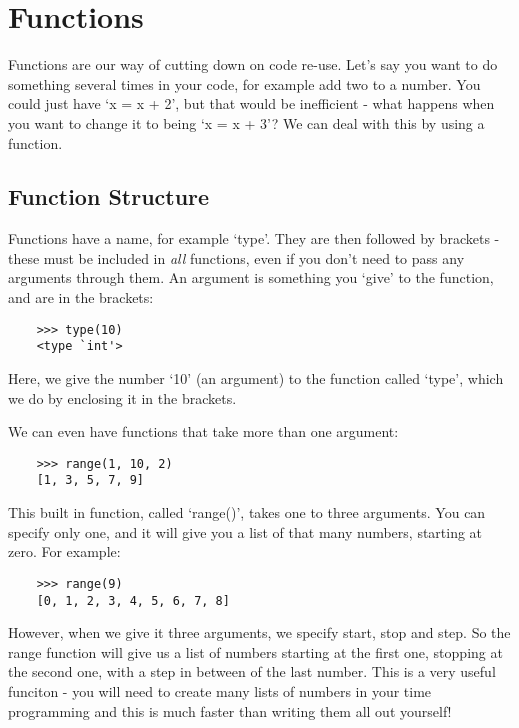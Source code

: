 \section{Functions}

Functions are our way of cutting down on code re-use. Let's say you want to do
something several times in your code, for example add two to a number. You could
just have `x = x + 2', but that would be inefficient - what happens when you
want to change it to being `x = x + 3'? We can deal with this by using a
function.

\subsection{Function Structure}

Functions have a name, for example `type'. They are then followed by brackets -
these must be included in \emph{all} functions, even if you don't need to pass
any arguments through them. An argument is something you `give' to the function,
and are in the brackets:

\begin{lstlisting}
    >>> type(10)
    <type `int'>
\end{lstlisting}

Here, we give the number `10' (an argument) to the function called `type', which
we do by enclosing it in the brackets.

We can even have functions that take more than one argument:

\begin{lstlisting}
    >>> range(1, 10, 2)
    [1, 3, 5, 7, 9]
\end{lstlisting}

This built in function, called `range()', takes one to three arguments. You can specify only one, and it will give you a list of that many numbers, starting at zero. For example:

\begin{lstlisting}
    >>> range(9)
    [0, 1, 2, 3, 4, 5, 6, 7, 8]
\end{lstlisting}

However, when we give it three arguments, we specify start, stop and step. So
the range function will give us a list of numbers starting at the first one,
stopping at the second one, with a step in between of the last number. This is a
very useful funciton - you will need to create many lists of numbers in your
time programming and this is much faster than writing them all out yourself!

